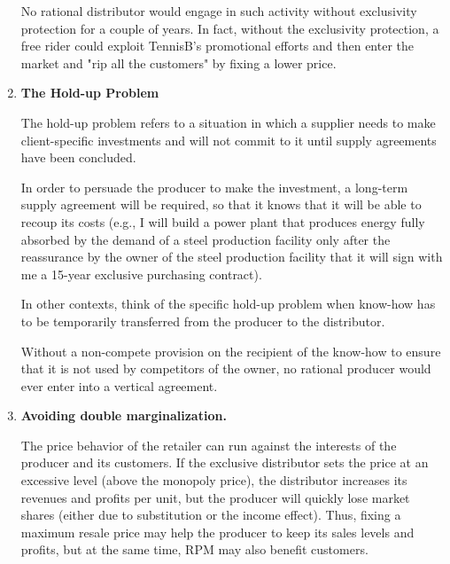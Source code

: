 \begin{enumerate}[label=(\alph*)]
            No rational distributor would engage in such activity without exclusivity protection for a couple of years. In fact, without the exclusivity protection, a free rider could exploit TennisB’s promotional efforts and then enter the market and "rip all the customers" by fixing a lower price.
        
            \item \textbf{The Hold-up Problem}
        
            The hold-up problem refers to a situation in which a supplier needs to make client-specific investments and will not commit to it until supply agreements have been concluded.
        
            In order to persuade the producer to make the investment, a long-term supply agreement will be required, so that it knows that it will be able to recoup its costs (e.g., I will build a power plant that produces energy fully absorbed by the demand of a steel production facility only after the reassurance by the owner of the steel production facility that it will sign with me a 15-year exclusive purchasing contract).
        
            In other contexts, think of the specific hold-up problem when know-how has to be temporarily transferred from the producer to the distributor.
        
            Without a non-compete provision on the recipient of the know-how to ensure that it is not used by competitors of the owner, no rational producer would ever enter into a vertical agreement.
        
            \item \textbf{Avoiding double marginalization.}
        
            The price behavior of the retailer can run against the interests of the producer and its customers. If the exclusive distributor sets the price at an excessive level (above the monopoly price), the distributor increases its revenues and profits per unit, but the producer will quickly lose market shares (either due to substitution or the income effect). Thus, fixing a maximum resale price may help the producer to keep its sales levels and profits, but at the same time, RPM may also benefit customers.

        

\end{enumerate}
